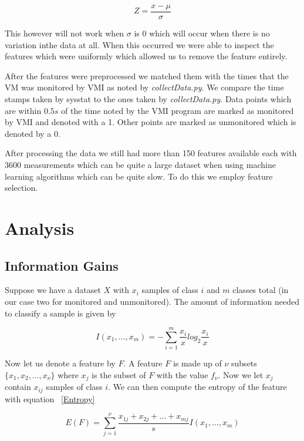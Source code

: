 \begin{equation}\label{ZScore}
	Z = \frac{x-\mu}{\sigma}
\end{equation}


This however will not work when $\sigma$ is 0 which will occur when there is no variation inthe data at all. When this occurred we were able to inspect the features which were uniformly which allowed us to remove the feature entirely. 

After the features were preprocessed we matched them with the times that the VM was monitored by VMI as noted by \textit{collectData.py}. We compare the time stamps taken by sysstat to the ones taken by \textit{collectData.py}. Data points which are within $0.5s$ of the time noted by the VMI program are marked as monitored by VMI and denoted with a 1. Other points are marked as unmonitored which is denoted by a 0. 

After processing the data we still had more than 150 features available each with 3600 measurements which can be quite a large dataset when using machine learning algorithms which can be quite slow. To do this we employ feature selection.


\section{Analysis}
\subsection{Information Gains}
Suppose we have a dataset $X$ with $x_i$ samples of class $i$ and $m$ classes total (in our case two for monitored and unmonitored). The amount of information needed to classify a sample is given by 

\begin{equation}\label{InfoGain}
	I(x_1,...,x_m)=-\sum_{i=1}^{m}\frac{x_i}{x}log_2 \frac{x_i}{x}
\end{equation}

Now let us denote a feature by $F$. A feature $F$ is made up of $\nu$ subsets $\{x_1,x_2,...,x_\nu \}$ where $x_j$ is the subset of $F$ with the value $f_\nu$. Now we let $x_j$ contain $x_{ij}$ samples of class $i$. We can then compute the entropy of the feature with equation ~\ref{Entropy} 

\begin{equation}\label{Entropy}
	E(F) = \sum_{j=1}^{\nu} \frac{x_{1j}+x_{2j}+...+x_{mj}}{s}I(x_1,...,x_m)
\end{equation}


